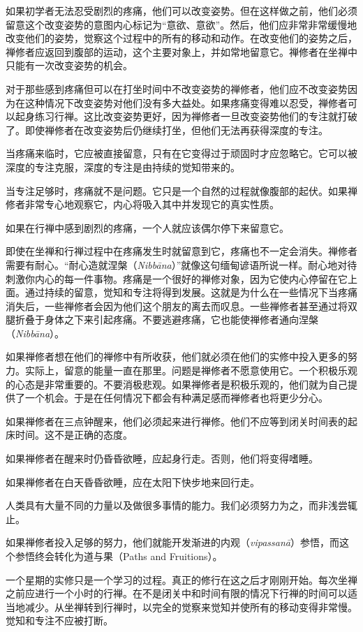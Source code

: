 如果初学者无法忍受剧烈的疼痛，他们可以改变姿势。但在这样做之前，他们必须留意这个改变姿势的意图内心标记为“意欲、意欲”。然后，他们应非常非常缓慢地改变他们的姿势，觉察这个过程中的所有的移动和动作。在改变他们的姿势之后，禅修者应返回到腹部的运动，这个主要对象上，并如常地留意它。禅修者在坐禅中只能有一次改变姿势的机会。

对于那些感到疼痛但可以在打坐时间中不改变姿势的禅修者，他们应不改变姿势因为在这种情况下改变姿势对他们没有多大益处。如果疼痛变得\1难以忍受，禅修者可以起身练习行禅。这比改变姿势更好，因为禅修者一旦改变姿势他们的专注就打破了。即使禅修者在改变姿势后仍继续打坐，但他们无法再获得深度的专注。

当疼痛来临时，它应被直接留意，只有在它变得过于顽固时才应忽略它。它可以被深度的专注克服，深度的专注是由持续的觉知带来的。

当专注足够时，疼痛就不是问题。它只是一个自然的过程就像腹部的起伏。如果禅修者非常专心地观察它，内心将吸入其中并发现它的真实性质。

如果在行禅中感到剧烈的疼痛，一个人就应该偶尔停下来留意它。

即使在坐禅和行禅过程中在疼痛发生时就留意到它，疼痛也不一定会消失。禅修者需要有耐心。“耐心造就涅槃（{\it Nibb\=ana}）”就像这句缅甸谚语所说一样。耐心地对待刺激你内心的每一件事物。疼痛是一个很好的禅修对象，因为它使内心停留在它上面。通过持续的留意，觉知和专注将得到发展。这就是为什么在一些情况下当疼痛消失后，一些禅修者会因为他们这个朋友的离去而叹息。一些禅修者甚至通过将双腿折叠于身体之下来引起疼痛。不要逃避疼痛，它也能使禅修者通向涅槃（{\it Nibb\=ana}）。

如果禅修者想在他们的禅修中有所收获，他们就必须在他们的实修中投入更多的努力。实际上，留意的能量一直在那里。问题是禅修者不愿意使用它。一个积极乐观的心态是非常重要的。不要消极悲观。如果禅修者是积极乐观的，他们就为自己提供了一个\1机会。于是在任何情况下都会有种满足感而禅修者也将更少分心。

如果禅修者在三点钟醒来，他们必须起来进行禅修。他们不应等到闭关时间表的起床时间。这不是正确的态度。

如果禅修者在醒来时仍昏昏欲睡，应起身行走。否则，他们将变得嗜睡。

如果禅修者在白天昏昏欲睡，应在太阳下快步地来回行走。

人类具有大量不同的力量以及做很多事情的能力。我们必须努力为之，而非浅尝辄止。

如果禅修者投入足够的努力，他们就能开发渐进的内观（{\it vipassan\=a}）参悟，而这个参悟终会转化为道与果（Paths and Fruitions）。

一个星期的实修只是一个学习的过程。真正的修行在这之后才刚刚开始。每次坐禅之前应进行一个小时的行禅。在不是闭关中和时间有限的情况下行禅的时间可以适当地减少。从坐禅转到行禅时，以完全的觉察来觉知并使所有的移动变得非常慢。觉知和专注不应被打断。

